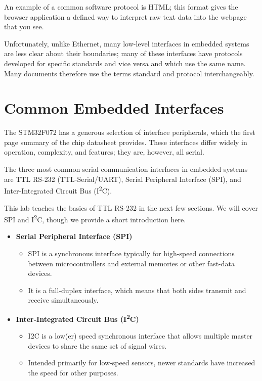 \documentclass[openany,11pt,fleqn]{book} %
\begin{document}
An example of a common software protocol is HTML; this format gives the browser application a defined way to interpret raw text data into the webpage that you see. 

Unfortunately, unlike Ethernet, many low-level interfaces in embedded systems are less clear about their boundaries; many of these interfaces have protocols developed for specific standards and vice versa and which use the same name. Many documents therefore use the terms standard and protocol interchangeably. 
 

\section{Common Embedded Interfaces}
The STM32F072 has a generous selection of interface peripherals, which the first page summary of the chip datasheet provides. These interfaces differ widely in operation, complexity, and features; they are, however, all serial. 

The three most common serial communication interfaces in embedded systems are TTL RS-232 (TTL-Serial/UART), Serial Peripheral Interface (SPI), and Inter-Integrated Circuit Bus (I\textsuperscript{2}C). 

This lab teaches the basics of TTL RS-232 in the next few sections. We will cover SPI and I\textsuperscript{2}C, though we provide a short introduction here. 

\begin{itemize}
    \item \textbf{Serial Peripheral Interface (SPI)}
    \begin{itemize}
        \item SPI is a synchronous interface typically for high-speed connections between microcontrollers and external memories or other fast-data devices.
        \item It is a full-duplex interface, which means that both sides transmit and receive simultaneously.
    \end{itemize}
    \item \textbf{Inter-Integrated Circuit Bus (I\textsuperscript{2}C)}
    \begin{itemize}
        \item I2C is a low(er) speed synchronous interface that allows multiple master devices to share the same set of signal wires. 
        \item Intended primarily for low-speed sensors, newer standards have increased the speed for other purposes.
    \end{itemize}
\end{itemize}
\end{document}
